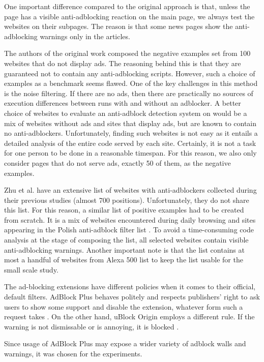 One important difference compared to the original approach is that, unless the page has a visible anti-adblocking
reaction on the main page, we always test the websites on their subpages. The reason is that
some news pages show the anti-adblocking warnings only in the articles.

The authors of the original work composed the negative examples set from 100 websites that do not display ads.
The reasoning behind this is that they are guaranteed not to contain any anti-adblocking scripts.
However, such a choice of examples as a benchmark seems flawed.
One of the key challenges in this method is the noise filtering. If there are no ads, 
then there are practically no sources of execution differences between runs with and without an adblocker.
A better choice of websites to evaluate an anti-adblock detection system on would be a mix of websites without ads and sites that
display ads, but are known to contain no anti-adblockers.
Unfortunately, finding such websites is not easy as it entails a detailed analysis of the entire code
served by each site. Certainly, it is not a task for one person to be done in a reasonable timespan.
For this reason, we also only consider pages that do not serve ads, exactly 50 of them, as the negative examples.

Zhu et al. \cite{DBLP:conf/ndss/ZhuHQSY18} have an extensive list of websites with anti-adblockers collected during their
previous studies (almost 700 positions). Unfortunately, they do not share this list. 
For this reason, a similar list of positive examples had to be created from scratch.
It is a mix of websites encountered during daily browsing and sites appearing in the
Polish anti-adblock filter list \cite{github:anti-adblock-list}.
To avoid a time-consuming code analysis at the stage of composing the list, 
all selected websites contain visible anti-adblocking warnings.
Another important note is that the list contains at most a handful of websites 
from Alexa 500 list \cite{alexa-list} to keep the list
usable for the small scale study.

The ad-blocking extensions have different policies when it comes to their official, default filters.
AdBlock Plus behaves politely and respects publishers' right to ask users to show some support
and disable the extension, whatever form such a request takes \cite{adblock:policy}.
On the other hand, uBlock Origin employs a different rule. If the warning is not dismissable or is annoying,
it is blocked \cite{vice:ublock-policy}.

Since usage of AdBlock Plus may expose a wider variety of adblock walls and warnings, 
it was chosen for the experiments.

